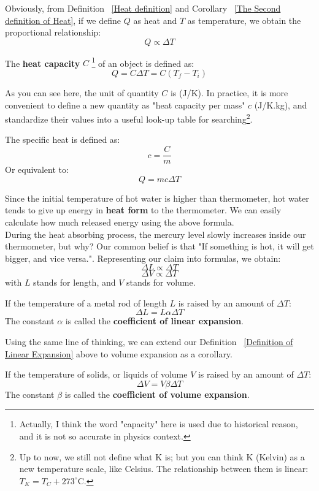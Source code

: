 \documentclass[phyai.tex]{subfiles}
\begin{document}
Obviously, from Definition ~\ref{Heat definition} and Corollary ~\ref{The Second definition of Heat}, if we define $Q$ as heat and $T$ as temperature, we obtain the proportional relationship:
$$ Q\propto \Delta T $$
\begin{definition}
	\label{Heat Capacity Definition}
	The \textbf{heat capacity} $C$ \footnote[1]{Actually, I think the word "capacity" here is used due to historical reason, and it is not so accurate in physics context.} of an object is defined as:
	$$ Q=C\Delta T=C(T_{f}-T_{i}) $$
\end{definition}
As you can see here, the unit of quantity $C$ is (J/K). In practice, it is more convenient to define a new quantity as "heat capacity per mass" $c$ (J/K.kg), and standardize their values into a useful look-up table for searching\footnote[2]{Up to now, we still not define what K is; but you can think K (Kelvin) as a new temperature scale, like Celsius. The relationship between them is linear: $ T_{K} =T_{C}+273^{\circ}\text{C}$.}.
\begin{corollary}
	\label{Specific Heat Definition}
	The specific heat is defined as: $$ c=\frac{C }{m} $$ Or equivalent to: $$ Q=mc\Delta T $$
\end{corollary}
Since the initial temperature of hot water is higher than thermometer, hot water tends to give up energy in \textbf{heat form} to the thermometer. We can easily calculate how much released energy using the above formula.
\\ During the heat absorbing process, the mercury level slowly increases inside our thermometer, but why? Our common belief is that "If something is hot, it will get bigger, and vice versa.". Representing our claim into formulas, we obtain:
$$ \Delta L \propto \Delta T $$ $$\Delta V \propto \Delta T$$
with $L$ stands for length, and $V$ stands for volume.
\begin{definition}
	If the temperature of a metal rod of length $L$ is raised by an amount of $\Delta T$: $$ \Delta L=L\alpha\Delta T $$
	The constant $\alpha$ is called the \textbf{coefficient of linear expansion}.
	\label{Definition of Linear Expansion}
\end{definition}
Using the same line of thinking, we can extend our Definition ~\ref{Definition of Linear Expansion} above to volume expansion as a corollary.
\begin{corollary}
	If the temperature of solids, or liquids of volume $V$ is raised by an amount of $\Delta T$: $$ \Delta V=V\beta\Delta T $$
	\label{Definition of Volume Expansion}
	The constant $\beta$ is called the \textbf{coefficient of volume expansion}.
\end{corollary}
\end{document}
